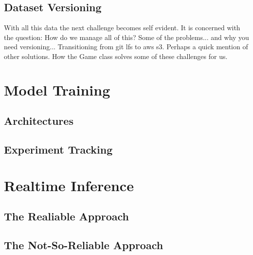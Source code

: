 \subsection{Dataset Versioning}
With all this data the next challenge becomes self evident.
It is concerned with the question: How do we manage all of this?
Some of the problems... and why you need versioning...
Transitioning from git lfs to aws s3.  Perhaps a quick mention of other solutions.
How the Game class solves some of these challenges for us.


\section{Model Training}
\lipsum[7]

\subsection{Architectures}
\lipsum[6]

\subsection{Experiment Tracking}
\lipsum[6]



\section{Realtime Inference}
\lipsum[7]

\subsection{The Realiable Approach}
\lipsum[6]

\subsection{The Not-So-Reliable Approach}
\lipsum[6]
